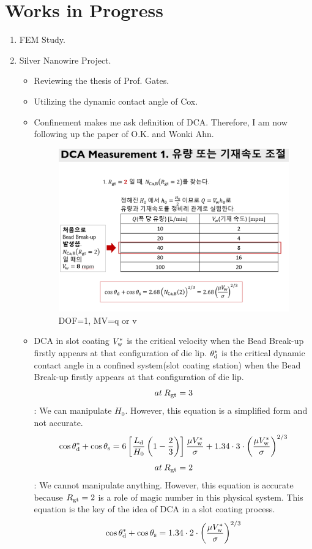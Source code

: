 \documentclass{article}
\begin{document}
\section{Works in Progress}
\begin{enumerate}
\item FEM Study.

 \item Silver Nanowire Project.
       \begin{itemize}
        \item Reviewing the thesis of Prof. Gates\cite{gates1999slot}.
        \item Utilizing the dynamic contact angle of Cox\cite{cox1986dynamics}.
        \item Confinement makes me ask definition of DCA. Therefore, I am now following up the paper of O.K. and Wonki Ahn.
        \begin{figure}[!ht]
\centering
\includegraphics[scale=0.35]{figures/DCA_measurement_q_or_v.png}
\caption{DOF=1, MV=q or v}
\end{figure}
\item DCA in slot coating
\newline \newline
$ V_\textup{w}^{*} $ is the critical velocity when the Bead Break-up firstly appears at that configuration of die lip.\newline
$\theta_\textup{d}^{*} $ is the critical dynamic contact angle in a confined system(slot coating station) when the Bead Break-up firstly appears at that configuration of die lip.
$$ at\:  R_\textup{gt}=3 $$ : We can manipulate $H_0$. However, this equation is a simplified form and not accurate.
$$ \cos\theta_\textup{d}^{*} + \cos\theta_\textup{s}=6\left [ \frac{L_\textup{d}}{H_0}\left ( 1-\frac{2}{3} \right ) \right ]\frac{\mu V_\textup{w}^{*}}{\sigma}+1.34\cdot 3\cdot \left ( \frac{\mu V_\textup{w}^{*}}{\sigma} \right)^{2/3} $$
\newline
$$ at\:  R_\textup{gt}=2 $$ : We cannot manipulate anything. However, this equation is accurate because $ R_\textup{gt}=2 $ is a role of magic number in this physical system. This equation is the key of the idea of DCA in a slot coating process.
$$ \cos\theta_\textup{d}^{*} + \cos\theta_\textup{s}=1.34\cdot 2\cdot \left ( \frac{\mu V_\textup{w}^{*}}{\sigma} \right)^{2/3} $$
        

\end{itemize}
\end{enumerate}
\end{document}
